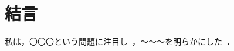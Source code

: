 \documentclass[11pt,dvipdfmx,svgnames,a4paper,uplatex]{ujarticle}
\begin{document}
\textcolor{LightGray}{
}


\section{結言}

私は，〇〇〇という問題に注目し~\cite{Goto2017a,GotoJPS2018}，〜〜〜を明らかにした~\cite{Araki_master_thesis}．

\printbibliography[title=参考文献]
\end{document}
